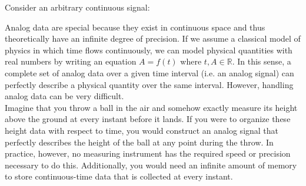 
Consider an arbitrary continuous signal:


\begin{center}
\end{center}

Analog data are special because they exist in continuous space and thus theoretically have an infinite degree of precision. If we assume a classical model of physics in which time flows continuously, we can model physical quantities with real numbers by writing an equation $A=f(t)$ where $t,A\in\mathbb{R}$. In this sense, a complete set of analog data over a given time interval (i.e. an analog signal) can perfectly describe a physical quantity over the same interval. However, handling analog data can be very difficult. \\

Imagine that you throw a ball in the air and somehow exactly measure its height above the ground at every instant before it lands. If you were to organize these height data with respect to time, you would construct an analog signal that perfectly describes the height of the ball at any point during the throw. In practice, however, no measuring instrument has the required speed or precision necessary to do this. Additionally, you would need an infinite amount of memory to store continuous-time data that is collected at every instant. \\\\

